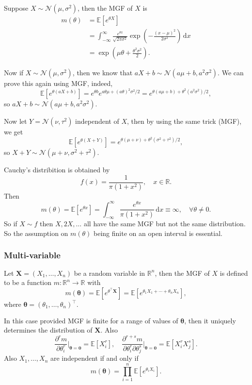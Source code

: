 \begin{example}
    Suppose $X\sim\mathcal N(\mu,\sigma^2)$, then the MGF of $X$ is
    \begin{align*}
        m(\theta)&=\mathbb E[e^{\theta X}]\\
        &=\int_{-\infty}^\infty \frac{e^{\theta x}}{\sqrt{2\pi \sigma^2}}\exp\left( -\frac{(x-\mu)^2}{2\sigma^2}  \right)\,\mathrm dx\\
        &=\exp \left( \mu\theta+\frac{\theta^2\sigma^2}{2} \right).
    \end{align*}

    Now if $X\sim\mathcal N(\mu,\sigma^2)$, then we know that $aX+b\sim\mathcal N(a\mu+b,a^2\sigma^2)$.
    We can prove this again using MGF, indeed,
    $$\mathbb E[e^{\theta(aX+b)}]=e^{\theta b}e^{a\theta\mu+(a\theta)^2\sigma^2/2}=e^{\theta(a\mu +b)+\theta^2(a^2\sigma^2)/2},$$
    so $aX+b\sim\mathcal N(a\mu+b,a^2\sigma^2)$.

    Now let $Y=\mathcal N(\nu,\tau^2)$ independent of $X$, then by using the same trick (MGF), we get
    \[
        \mathbb E[e^{\theta(X+Y)}]=e^{\theta(\mu+\nu)+\theta^2(\sigma^2+\tau^2)/2},
    \]
    so $X+Y\sim\mathcal N(\mu+\nu,\sigma^2+\tau^2)$.
\end{example}
\begin{example}
    Cauchy's distribition is obtained by
    \[
        f(x)=\frac{1}{\pi(1+x^2)},\quad x\in\mathbb R.
    \]
    Then 
    \[
        m(\theta) = \mathbb{E}[e^{\theta x}] = \int_{-\infty}^{\infty} \frac{e^{\theta x}}{\pi(1+x^2)} \,\mathrm{d}x \equiv \infty,\quad \forall \theta\neq 0.
    \]
    So if $X\sim f$ then $X,2X,\ldots$ all have the same MGF but not the same distribution.
    So the assumption on $m(\theta)$ being finite on an open interval is essential.
\end{example}

\subsubsection*{Multi-variable}
\begin{definition}
    Let $\mathbf{X}=(X_1,\ldots,X_n)$ be a random variable in $\mathbb R^n$, then the MGF of $X$ is defined to be a function $m:\mathbb R^n\to\mathbb R$ with
    $$m(\boldsymbol{\theta})=\mathbb E[e^{\theta^\top \mathbf{X}}]=\mathbb E[e^{\theta_1X_1+\cdots+\theta_nX_n}],$$
    where $\boldsymbol{\theta}=(\theta_1,\ldots,\theta_n)^\top$.
\end{definition}
\begin{theorem}
    In this case provided MGF is finite for a range of values of $ \boldsymbol{\theta} $, then it uniquely determines the distribution of $ \mathbf{X} $. Also 
    \[
        \frac{\partial^rm}{\partial\theta_i^r}\Big|_{\boldsymbol{\theta}=\mathbf{0}}=\mathbb E[X_i^r],\quad \frac{\partial^{r+s}m}{\partial\theta_i^r\partial\theta_j^s}\Big|_{\boldsymbol{\theta}=\mathbf{0}}=\mathbb E[X_i^rX_j^s].
    \]
    Also $X_1,\ldots,X_n$ are independent if and only if 
    $$m(\boldsymbol{\theta})=\prod_{i=1}^n\mathbb E[e^{\theta_iX_i}].$$
\end{theorem}